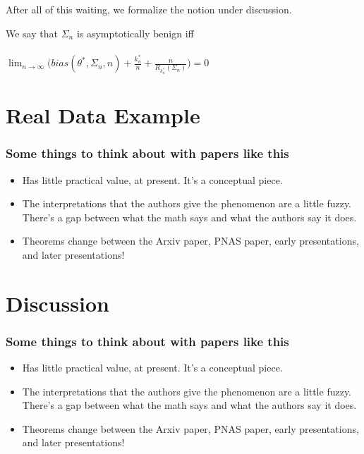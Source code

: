 \documentclass[pdf]{beamer}
\begin{document}
\begin{frame}
After all of this waiting, we formalize the notion under discussion.

\begin{definition}
We say that $\Sigma_{n}$ is asymptotically benign iff \\~\\

$\displaystyle \lim_{n\to\infty} \big ( bias(\theta^{*}, \Sigma_{n}, n)  + \frac{k^{*}_{n}}{n} +  \frac{n}{R_{k^{*}_{n}}(\Sigma_{n})} \big ) = 0$

\end{definition}
\end{frame}


\section{Real Data Example}

\begin{frame}
\frametitle{Some things to think about with papers like this}
\begin{itemize}
\item Has little practical value, at present.  It's a conceptual piece.
\item The interpretations that the authors give the phenomenon are a little fuzzy.  There's a gap between what the math says and what the authors say it does.
\item Theorems change between the Arxiv paper, PNAS paper, early presentations, and later presentations!
\end{itemize}
\end{frame}

\section{Discussion}

\begin{frame}
\frametitle{Some things to think about with papers like this}
\begin{itemize}
\item Has little practical value, at present.  It's a conceptual piece.
\item The interpretations that the authors give the phenomenon are a little fuzzy.  There's a gap between what the math says and what the authors say it does.
\item Theorems change between the Arxiv paper, PNAS paper, early presentations, and later presentations!
\end{itemize}
\end{frame}
\end{document}

